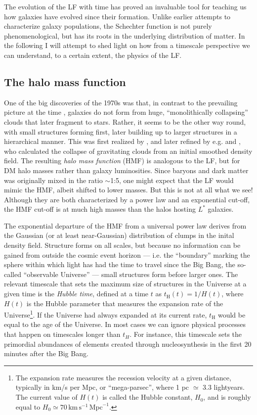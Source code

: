 \documentclass[useAMS,usenatbib,bibyear]{aa}
\begin{document}
The evolution of the LF with time has proved an invaluable tool for teaching us how galaxies have evolved since their formation.
Unlike earlier attempts to characterize galaxy populations, the Schechter function is not purely phenomenological, but has its roots in the underlying distribution of matter.
In the following I will attempt to shed light on how from a timescale perspective we can understand, to a certain extent, the physics of the LF.

\subsection{The halo mass function}
\label{sec:HMF}

One of the big discoveries of the 1970s was that, in contrast to the prevailing picture at the time \citep{Eggen1962}, galaxies do not form from huge, ``monolithically collapsing'' clouds that later fragment to stars.
Rather, it seems to be the other way round, with small structures forming first, later building up to larger structures in a hierarchical manner.
This was first realized by \citet{Press1974}, and later refined by e.g. \citet{Sheth2002} and \citet{Tinker2008}, who calculated the collapse of gravitating clouds from an initial smoothed density field.
The resulting \emph{halo mass function} (HMF) is analogous to the LF,
but for DM halo masses rather than galaxy luminosities.
Since baryons and dark matter was originally mixed in the ratio $\sim$1:5, one might expect that the LF would mimic the HMF, albeit shifted to lower masses.
But this is not at all what we see! Although they are both characterized by a power law and an exponential cut-off, the HMF cut-off is at much high masses than the halos hosting $L^*$ galaxies.

The exponential departure of the HMF from a universal power law derives from the Gaussian (or at least near-Gaussian) distribution of clumps in the inital density field.
Structure forms on all scales, but because no information can be gained from outside the cosmic event horizon --- i.e.
the ``boundary'' marking the sphere within which light has had the time to travel since the Big Bang, the so-called ``observable Universe'' --- small structures form before larger ones.
The relevant timescale that sets the maximum size of structures in the Universe at a given time is the \emph{Hubble time}, defined at a time $t$ as $t_\mathrm{H}(t) = 1/H(t)$, where $H(t)$ is the Hubble parameter that measures the expansion rate of the Universe\footnote{The expansion rate measures the recession velocity at a given distance, typically in km/s per Mpc, or ``mega-parsec'', where 1 pc $\simeq$ 3.3 lightyears.
The current value of $H(t)$ is called the Hubble constant, $H_0$, and is roughly equal to $H_0\simeq70\,\mathrm{km}\,\mathrm{s}^{-1}\,\mathrm{Mpc}^{-1}$.}.
If the Universe had always expanded at its current rate, $t_\mathrm{H}$ would be equal to the age of the Universe.
In most cases we can ignore physical processes that happen on timescales longer than $t_{H}$.
For instance, this timescale sets the primordial abundances of elements created through nucleosynthesis in the first 20 minutes after the Big Bang.
\end{document}

